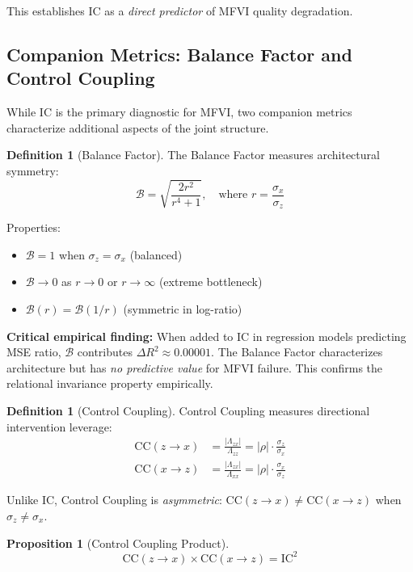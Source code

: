 \documentclass[10pt]{article} %
\theoremstyle{plain}
\newtheorem{proposition}[theorem]{Proposition}
\theoremstyle{definition}
\newtheorem{definition}[theorem]{Definition}
\newcommand{\IC}{\mathrm{IC}}  %
\newcommand{\BB}{\mathcal{B}}  %
\newcommand{\CC}{\mathrm{CC}}  %
\begin{document}
\noindent This establishes IC as a \emph{direct predictor} of MFVI quality degradation.

\subsection{Companion Metrics: Balance Factor and Control Coupling}
\label{sec:companion}

While IC is the primary diagnostic for MFVI, two companion metrics characterize additional aspects of the joint structure.

\begin{definition}[Balance Factor]
The Balance Factor measures architectural symmetry:
\begin{equation}
\BB = \sqrt{\frac{2r^2}{r^4 + 1}}, \quad \text{where } r = \frac{\sigma_x}{\sigma_z}
\end{equation}
\end{definition}

Properties:
\begin{itemize}
    \item $\BB = 1$ when $\sigma_z = \sigma_x$ (balanced)
    \item $\BB \to 0$ as $r \to 0$ or $r \to \infty$ (extreme bottleneck)
    \item $\BB(r) = \BB(1/r)$ (symmetric in log-ratio)
\end{itemize}

\textbf{Critical empirical finding:} When added to IC in regression models predicting MSE ratio, $\BB$ contributes $\Delta R^2 \approx 0.00001$. The Balance Factor characterizes architecture but has \emph{no predictive value} for MFVI failure. This confirms the relational invariance property empirically.

\begin{definition}[Control Coupling]
Control Coupling measures directional intervention leverage:
\begin{align}
\CC(z \to x) &= \frac{|\Lambda_{zx}|}{\Lambda_{zz}} = |\rho| \cdot \frac{\sigma_z}{\sigma_x} \\
\CC(x \to z) &= \frac{|\Lambda_{zx}|}{\Lambda_{xx}} = |\rho| \cdot \frac{\sigma_x}{\sigma_z}
\end{align}
\end{definition}

Unlike IC, Control Coupling is \emph{asymmetric}: $\CC(z \to x) \neq \CC(x \to z)$ when $\sigma_z \neq \sigma_x$.

\begin{proposition}[Control Coupling Product]
\begin{equation}
\CC(z \to x) \times \CC(x \to z) = \IC^2
\end{equation}
\end{proposition}
\end{document}
